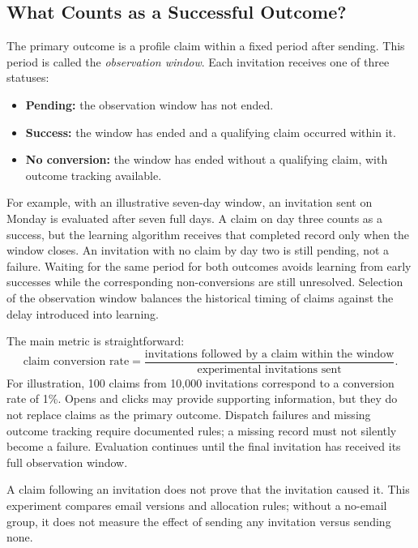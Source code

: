 \subsection{What Counts as a Successful Outcome?}

The primary outcome is a profile claim within a fixed period after sending. This period is called the \emph{observation window}. Each invitation receives one of three statuses:
\begin{itemize}
    \item \textbf{Pending:} the observation window has not ended.
    \item \textbf{Success:} the window has ended and a qualifying claim occurred within it.
    \item \textbf{No conversion:} the window has ended without a qualifying claim, with outcome tracking available.
\end{itemize}

For example, with an illustrative seven-day window, an invitation sent on Monday is evaluated after seven full days. A claim on day three counts as a success, but the learning algorithm receives that completed record only when the window closes. An invitation with no claim by day two is still pending, not a failure. Waiting for the same period for both outcomes avoids learning from early successes while the corresponding non-conversions are still unresolved. Selection of the observation window balances the historical timing of claims against the delay introduced into learning.

The main metric is straightforward:
\begin{equation}
\text{claim conversion rate} =
\frac{\text{invitations followed by a claim within the window}}
{\text{experimental invitations sent}}.
\label{eq:method_rate}
\end{equation}
For illustration, 100 claims from 10,000 invitations correspond to a conversion rate of 1\%. Opens and clicks may provide supporting information, but they do not replace claims as the primary outcome. Dispatch failures and missing outcome tracking require documented rules; a missing record must not silently become a failure. Evaluation continues until the final invitation has received its full observation window.

A claim following an invitation does not prove that the invitation caused it. This experiment compares email versions and allocation rules; without a no-email group, it does not measure the effect of sending any invitation versus sending none.

